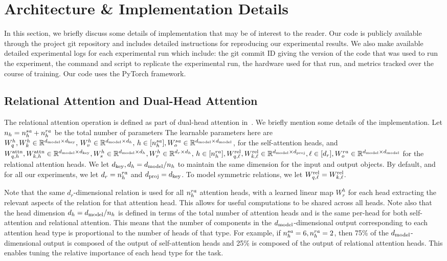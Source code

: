 
\section{Architecture \& Implementation Details}\label{sec:appendix_implementation}

In this section, we briefly discuss some details of implementation that may be of interest to the reader. Our code is publicly available through the project git repository and includes detailed instructions for reproducing our experimental results. We also make available detailed experimental logs for each experimental run which include: the git commit ID giving the version of the code that was used to run the experiment, the command and script to replicate the experimental run, the hardware used for that run, and metrics tracked over the course of training. Our code uses the PyTorch framework.

\subsection{Relational Attention and Dual-Head Attention}

The relational attention operation is defined as part of dual-head attention in~. We briefly mention some details of the implementation. Let $n_h = n_h^{sa} + n_h^{ra}$ be the total number of parameters The learnable parameters here are $W_q^h, W_k^h \in \mathbb{R}^{d_{\mathrm{model}} \times d_{\mathrm{key}}},\, W_v^h \in \mathbb{R}^{d_{\mathrm{model}} \times d_h}, \, h \in [n_h^{sa}], W_o^{sa} \in \mathbb{R}^{d_{\mathrm{model}} \times d_{\mathrm{model}}}$, for the self-attention heads, and $W_{q, h}^{\mathrm{attn}}, W_{k, h}^{\mathrm{attn}} \in \mathbb{R}^{d_{\mathrm{model}} \times d_{\mathrm{key}}}, W_s^h \in \mathbb{R}^{d_{\mathrm{model}} \times d_h}, W_r^h \in \mathbb{R}^{d_r \times d_h},\, h \in [n_h^{ra}], W_{q, \ell}^{\mathrm{rel}}, W_{k, \ell}^{\mathrm{rel}} \in \mathbb{R}^{d_{\mathrm{model}} \times d_{\mathrm{proj}}}, \ell \in [d_r], W_o^{ra} \in \mathbb{R}^{d_{\mathrm{model}} \times d_{\mathrm{model}}}$ for the relational attention heads. We let $d_{\mathrm{key}}, d_h = d_{\mathrm{model}} / n_h$ to maintain the same dimension for the input and output objects. By default, and for all our experiments, we let $d_r = n_h^{ra}$ and $d_{\mathrm{proj}} = d_{\mathrm{key}}$. To model symmetric relations, we let $W_{q, \ell}^{\mathrm{rel}} = W_{k, \ell}^{\mathrm{rel}}$.

Note that the same $d_r$-dimensional relation is used for all $n_h^{ra}$ attention heads, with a learned linear map $W_r^h$ for each head extracting the relevant aspects of the relation for that attention head. This allows for useful computations to be shared across all heads. Note also that the head dimension $d_h = d_{\mathrm{model}} / n_h$ is defined in terms of the total number of attention heads and is the same per-head for both self-attention and relational attention. This means that the number of components in the $d_{\mathrm{model}}$-dimensional output corresponding to each attention head type is proportional to the number of heads of that type. For example, if $n_h^{sa} = 6, n_h^{ra} = 2$, then 75\% of the $d_{\mathrm{model}}$-dimensional output is composed of the output of self-attention heads and 25\% is composed of the output of relational attention heads. This enables tuning the relative importance of each head type for the task.

